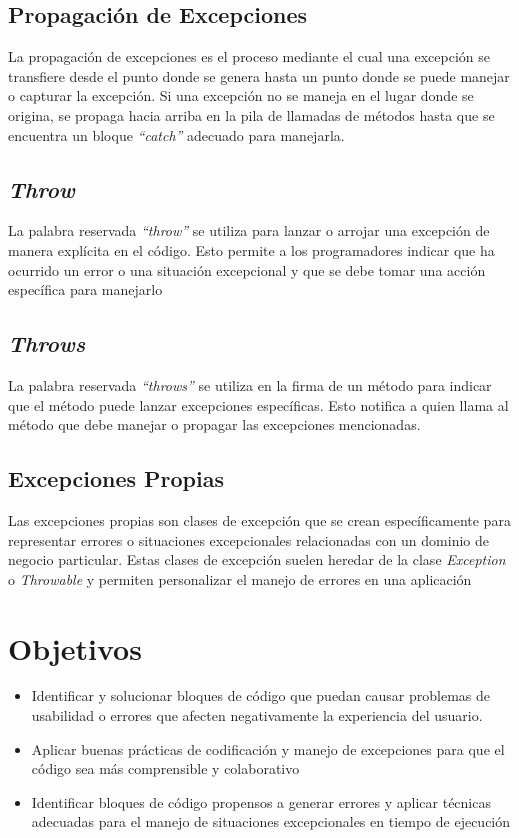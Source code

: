 \documentclass[11pt, twocolumn]{article}
\begin{document}
  \subsection*{Propagación de Excepciones}
  La propagación de excepciones es el proceso mediante el cual una excepción se transfiere desde el punto donde se genera hasta un punto donde se puede manejar o capturar la excepción. Si una excepción no se maneja en el lugar donde se origina, se propaga hacia arriba en la pila de llamadas de métodos hasta que se encuentra un bloque \textit{``catch''} adecuado para manejarla.

  \subsection*{\textit{Throw}}
  La palabra reservada \textit{``throw''} se utiliza para lanzar o arrojar una excepción de manera explícita en el código. Esto permite a los programadores indicar que ha ocurrido un error o una situación excepcional y que se debe tomar una acción específica para manejarlo

  \subsection*{\textit{Throws}}
  La palabra reservada \textit{``throws''} se utiliza en la firma de un método para indicar que el método puede lanzar excepciones específicas. Esto notifica a quien llama al método que debe manejar o propagar las excepciones mencionadas. 

  \subsection*{Excepciones Propias}
  Las excepciones propias son clases de excepción que se crean específicamente para representar errores o situaciones excepcionales relacionadas con un dominio de negocio particular. Estas clases de excepción suelen heredar de la clase \textit{Exception} o \textit{Throwable} y permiten personalizar el manejo de errores en una aplicación

  \section*{Objetivos}
  \begin{itemize}
    \item Identificar y solucionar bloques de código que puedan causar problemas de usabilidad o errores que afecten negativamente la experiencia del usuario.
    \item Aplicar buenas prácticas de codificación y manejo de excepciones para que el código sea más comprensible y colaborativo
    \item Identificar bloques de código propensos a generar errores y aplicar técnicas adecuadas para el manejo de situaciones excepcionales en tiempo de ejecución    
  \end{itemize}
\end{document}
